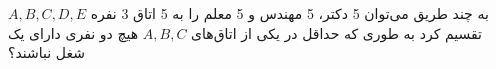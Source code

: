 \p    
به چند طریق می‌توان 5 دکتر، 5 مهندس و 5 معلم را به 5 اتاق 3 نفره 
$A,B,C,D,E$
تقسیم کرد به طوری که
حداقل در یکی از اتاق‌های 
$A,B,C$
هیچ دو نفری دارای یک شغل نباشند؟
